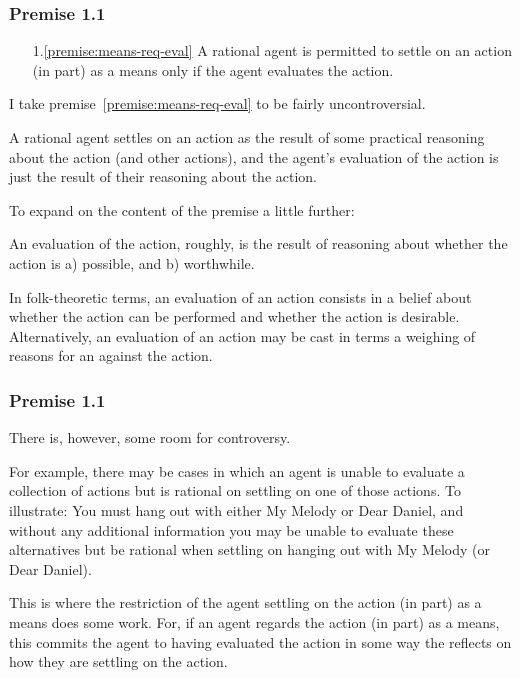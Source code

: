 \documentclass[noamssymb,
]{beamer} %
\newcommand{\hozlinedash}[0]{%
  \noindent\hdashrule[0.5ex][c]{\textwidth}{.1pt}{2.5pt}
}
\begin{document}
\begin{frame}
  \frametitle{Premise 1.1}

  \begin{itemize}
  \item[1.\ref{premise:means-req-eval}] A rational agent is permitted to settle on an action (in part) as a means only if the agent evaluates the action.
  \end{itemize}



  I take premise~\ref{premise:means-req-eval} to be fairly uncontroversial.

  A rational agent settles on an action as the result of some practical reasoning about the action (and other actions), and the agent's evaluation of the action is just the result of their reasoning about the action.

  \hozlinedash

  To expand on the content of the premise a little further:

  An evaluation of the action, roughly, is the result of reasoning about whether the action is a) possible, and b) worthwhile.


  In folk-theoretic terms, an evaluation of an action consists in a belief about whether the action can be performed and whether the action is desirable.
  Alternatively, an evaluation of an action may be cast in terms a weighing of reasons for an against the action.
\end{frame}

\begin{frame}
  \frametitle{Premise 1.1}

  There is, however, some room for controversy.

For example, there may be cases in which an agent is unable to evaluate a collection of actions but is rational on settling on one of those actions.
To illustrate: You must hang out with either My Melody or Dear Daniel, and without any additional information you may be unable to evaluate these alternatives but be rational when settling on hanging out with My Melody (or Dear Daniel).

This is where the restriction of the agent settling on the action (in part) as a means does some work.
For, if an agent regards the action (in part) as a means, this commits the agent to having evaluated the action in some way the reflects on how they are settling on the action.
\end{frame}
\end{document}
